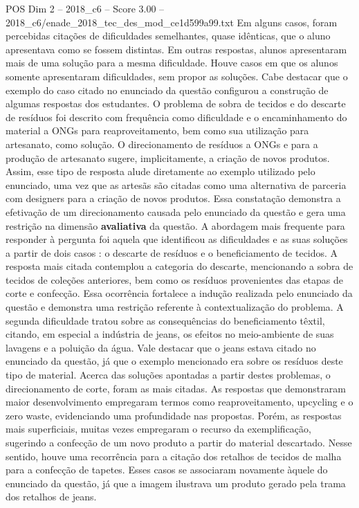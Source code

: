 \begin{textsample}{POS Dim 2 – 2018\_c6 – Score 3.00 – 2018\_c6/enade\_2018\_tec\_des\_mod\_ce1d599a99.txt}
Em alguns casos, foram percebidas citações de dificuldades semelhantes, quase idênticas, que o aluno apresentava como se fossem distintas.
Em outras respostas, alunos apresentaram mais de uma solução para a mesma dificuldade.
Houve casos em que os alunos somente apresentaram dificuldades, sem propor as soluções.
Cabe destacar que o exemplo do caso citado no enunciado da questão configurou a construção de algumas respostas dos estudantes.
O problema de sobra de tecidos e do descarte de resíduos foi descrito com frequência como dificuldade e o encaminhamento do material a ONGs para reaproveitamento, bem como sua utilização para artesanato, como solução.
O direcionamento de resíduos a ONGs e para a produção de artesanato sugere, implicitamente, a criação de novos produtos.
Assim, esse tipo de resposta alude diretamente ao exemplo utilizado pelo enunciado, uma vez que as artesãs são citadas como uma alternativa de parceria com designers para a criação de novos produtos.
Essa constatação demonstra a efetivação de um direcionamento causada pelo enunciado da questão e gera uma restrição na dimensão \textbf{avaliativa} da questão.
A abordagem mais frequente para responder à pergunta foi aquela que identificou as dificuldades e as suas soluções a partir de dois casos : o descarte de resíduos e o beneficiamento de tecidos.
A resposta mais citada contemplou a categoria do descarte, mencionando a sobra de tecidos de coleções anteriores, bem como os resíduos provenientes das etapas de corte e confecção.
Essa ocorrência fortalece a indução realizada pelo enunciado da questão e demonstra uma restrição referente à contextualização do problema.
A segunda dificuldade tratou sobre as consequências do beneficiamento têxtil, citando, em especial a indústria de jeans, os efeitos no meio-ambiente de suas lavagens e a poluição da água.
Vale destacar que o jeans estava citado no enunciado da questão, já que o exemplo mencionado era sobre os resíduos deste tipo de material.
Acerca das soluções apontadas a partir destes problemas, o direcionamento de corte, foram as mais citadas.
As respostas que demonstraram maior desenvolvimento empregaram termos como reaproveitamento, upcycling e o zero waste, evidenciando uma profundidade nas propostas.
Porém, as respostas mais superficiais, muitas vezes empregaram o recurso da exemplificação, sugerindo a confecção de um novo produto a partir do material descartado.
Nesse sentido, houve uma recorrência para a citação dos retalhos de tecidos de malha para a confecção de tapetes.
Esses casos se associaram novamente àquele do enunciado da questão, já que a imagem ilustrava um produto gerado pela trama dos retalhos de jeans.

\end{textsample}
